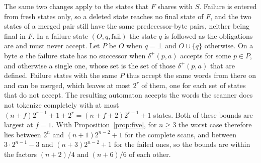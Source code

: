 \documentclass[11pt,a4paper]{article}
\theoremstyle{definition}
\theoremstyle{plain}
\begin{document}
The same two changes apply to the states that $F$ shares with $S$. Failure is entered from fresh states only, so a
deleted state reaches no final state of $F$, and the two states of a merged pair still have the same predecessor-byte
pairs, neither being final in $F$. In a failure state $(O, q, \mathrm{fail})$ the state $q$ is followed as the
obligations are and must never accept. Let $P$ be $O$ when $q = \bot$ and $O \cup \{q\}$ otherwise. On a byte $a$ the
failure state has no successor when $\delta^+(p, a)$ accepts for some $p \in P$, and otherwise a single one, whose set
is the set of those $\delta^+(p, a)$ that are defined. Failure states with the same $P$ thus accept the same words from
there on and can be merged, which leaves at most $2^r$ of them, one for each set of states that do not accept. The
resulting automaton accepts the words the scanner does not tokenize completely with at most
$(n + f)2^{r-1} + 1 + 2^r = (n + f + 2)2^{r-1} + 1$ states. Both of these bounds are largest at $f = 1$. With
Proposition~\ref{prop:five}, for $n \geq 3$ the worst case therefore lies between $2^n$ and $(n + 1)2^{n-2} + 1$ for the
complete scans, and between $3 \cdot 2^{n-1} - 3$ and $(n + 3)2^{n-2} + 1$ for the failed ones, so the bounds are within
the factors $(n + 2)/4$ and $(n + 6)/6$ of each other.
\end{document}
